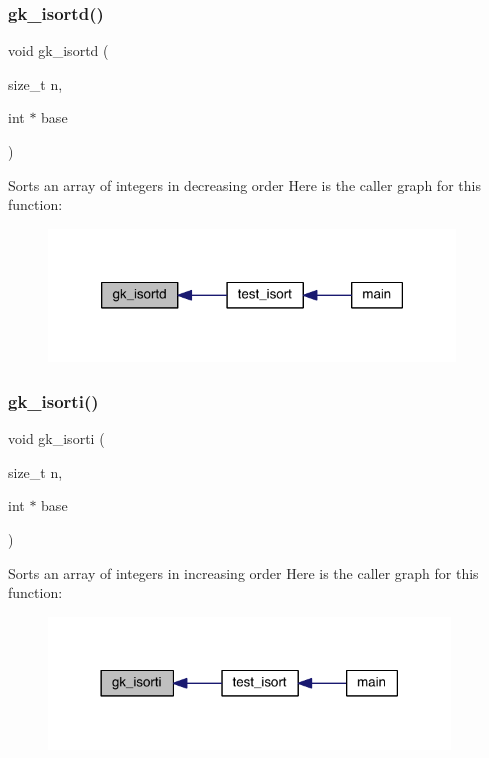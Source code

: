 \subsubsection{\texorpdfstring{gk\+\_\+isortd()}{gk\_isortd()}}
{\footnotesize\ttfamily void gk\+\_\+isortd (\begin{DoxyParamCaption}\item[{size\+\_\+t}]{n,  }\item[{int $\ast$}]{base }\end{DoxyParamCaption})}

Sorts an array of integers in decreasing order Here is the caller graph for this function\+:\nopagebreak
\begin{figure}[H]
\begin{center}
\leavevmode
\includegraphics[width=306pt]{a00077_a36a2b736c24758a30ff91e715c68b3a5_icgraph}
\end{center}
\end{figure}
\mbox{\label{a00077_a0661d91bb9fcaa78715176ae9d5f8825}} 
\subsubsection{\texorpdfstring{gk\+\_\+isorti()}{gk\_isorti()}}
{\footnotesize\ttfamily void gk\+\_\+isorti (\begin{DoxyParamCaption}\item[{size\+\_\+t}]{n,  }\item[{int $\ast$}]{base }\end{DoxyParamCaption})}

Sorts an array of integers in increasing order Here is the caller graph for this function\+:\nopagebreak
\begin{figure}[H]
\begin{center}
\leavevmode
\includegraphics[width=302pt]{a00077_a0661d91bb9fcaa78715176ae9d5f8825_icgraph}
\end{center}
\end{figure}
\mbox{\label{a00077_a1758da0e2e1acd50b3506f06fd69cd37}} 
